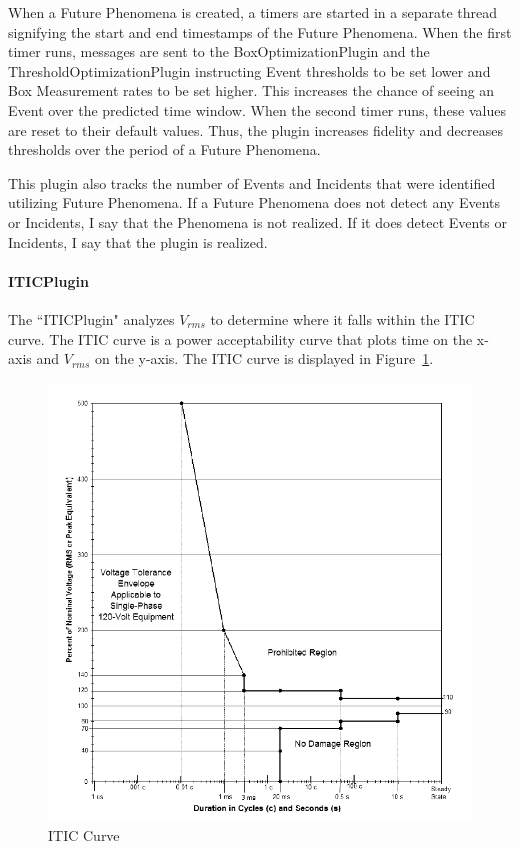 When a Future Phenomena is created, a timers are started in a separate thread signifying the start and end timestamps of the Future Phenomena. When the first timer runs, messages are sent to the BoxOptimizationPlugin and the ThresholdOptimizationPlugin instructing Event thresholds to be set lower and Box Measurement rates to be set higher. This increases the chance of seeing an Event over the predicted time window. When the second timer runs, these values are reset to their default values. Thus, the plugin increases fidelity and decreases thresholds over the period of a Future Phenomena.

This plugin also tracks the number of Events and Incidents that were identified utilizing Future Phenomena. If a Future Phenomena does not detect any Events or Incidents, I say that the Phenomena is not realized. If it does detect Events or Incidents, I say that the plugin is realized.

\paragraph{ITICPlugin}
The ``ITICPlugin" analyzes $V_{rms}$ to determine where it falls within the ITIC curve\cite{thallam2000power}. The ITIC curve is a power acceptability curve that plots time on the x-axis and $V_{rms}$ on the y-axis. The ITIC curve is displayed in Figure~\ref{fig:IticCurve}.

\begin{figure}
	\centering
	\includegraphics[width=\linewidth]{figures/itic.png}
	\caption{ITIC Curve}
	\label{fig:IticCurve}
\end{figure}

